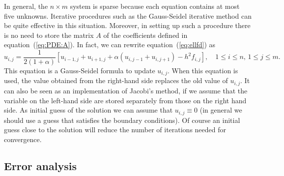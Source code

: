 In general, the $n\times m$ system is sparse because each equation
contains at most five unknowns.  Iterative procedures such as the
Gauss-Seidel iterative method can be quite effective in this
situation.  Moreover, in setting up such a procedure there is no need
to store the matrix $A$ of the coefficients defined in
equation~(\ref{eq:PDE:A}).  In fact, we can rewrite
equation~(\ref{eq:ellfd}) as
%
\begin{equation}
  u_{i,j} = \frac{1}{2(1+\alpha)} \left [ u_{i-1,j} +u_{i+1,j} +
    \alpha (u_{i,j-1}+u_{i,j+1}) - h^2 f_{i,j} \right ], \quad
  1 \le i \le n, \, 1 \le j \le m . \label{PDE:eq:Ell:Updateuij}
\end{equation}
%
This equation is a Gauss-Seidel formula to update $u_{i,j}$. When this
equation is used, the value obtained from the right-hand side replaces
the old value of $u_{i,j}$.  It can also be seen as an implementation
of Jacobi's method, if we assume that the variable on the left-hand
side are stored separately from those on the right hand side.  As
initial guess of the solution we can assume that $u_{i,j} \equiv 0$
(in general we should use a guess that satisfies the boundary
conditions).  Of course an initial guess close to the solution will
reduce the number of iterations needed for convergence.

\subsection{Error analysis}

